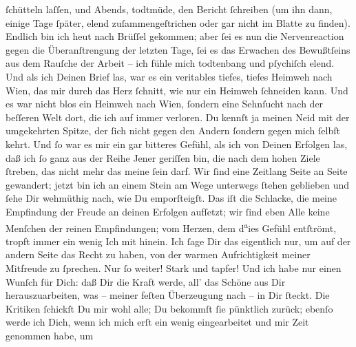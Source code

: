 \begin{ledgroupsized}[t]{13cm}
               ſchütteln laſſen, und Abends, todtmüde, den Bericht ſchreiben (um ihn dann\strikeout{)}, einige Tage ſpäter, elend zuſammengeſtrichen oder
               gar nicht im Blatte zu
               finden). Endlich  bin ich heut nach Brüſſel gekommen; aber ſei es nun die Nervenreaction gegen die
               Überanſtrengung der letzten Tage, ſei es das Erwachen des Bewußtſeins aus dem Rauſche
               der Arbeit – ich fühle mich todtenbang und pſychiſch elend. Und als ich Deinen Brief
               las, war es ein veritables tiefes, tiefes Heimweh nach Wien, das mir durch das Herz ſchnitt, {\pb}wie
               nur ein Heimweh ſchneiden kann. Und es war nicht blos ein Heimweh nach Wien, ſondern eine Sehnſucht nach der beſſeren Welt
               dort, die ich auf immer verloren. Du kennſt ja meinen Neid mit der umgekehrten
               Spitze, der ſich nicht gegen den Andern ſondern gegen mich ſelbſt kehrt. Und ſo war
               es mir ein gar bitteres Gefühl, als ich von Deinen Erfolgen las, daß ich ſo ganz aus
               der Reihe Jener geriſſen bin, die nach dem hohen Ziele ſtreben, das nicht mehr das
                   meine ſein darf. Wir ſind eine Zeitlang Seite an Seite gewandert; jetzt bin
               ich an einem Stein am Wege unterwegs ſtehen geblieben und ſehe Dir wehmüthig nach,
               wie Du emporſteigſt. Das iſt die Schlacke, die meine Empfindung der Freude an deinen
               Erfolgen aufſetzt; wir ſind eben Alle keine Menſchen der reinen Empfindungen; vom
               Herzen, dem d\substVorne{}\textsuperscript{a}\substDazwischen{}ie\substHinten{}s Gefühl entſtrömt, tropft immer ein wenig Ich mit hinein. Ich ſage Dir das
               eigentlich nur, um auf der andern Seite das Recht zu haben, von der warmen
               Aufrichtigkeit meiner Mitfreude zu ſprechen. Nur ſo weiter! Stark und tapfer! Und ich
               habe nur einen Wunſch für Dich: daß \strikeout{\textcolor{gray}{al}} Dir  die Kraft werde, all’ das Schöne
               aus Dir herauszuarbeiten, was – meiner feſten Überzeugung nach – in Dir ſteckt. Die
               Kritiken ſchickſt Du mir wohl alle; Du bekommſt ſie pünktlich zurück; ebenſo werde
               ich Dich, wenn ich mich erſt ein wenig eingearbeitet und mir Zeit genommen habe, um

\end{ledgroupsized}
